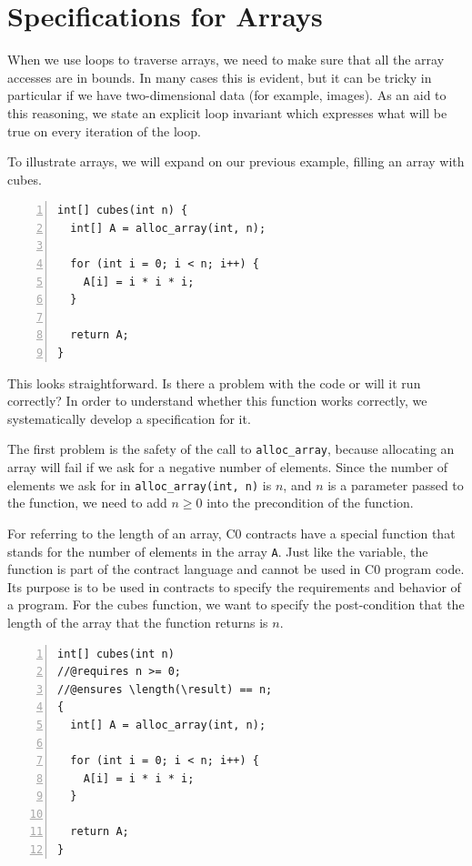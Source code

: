 \section{Specifications for Arrays}
\label{sec:arrays:spec}

When we use loops to traverse arrays, we need to make sure that all
the array accesses are in bounds.  In many cases this is evident, but
it can be tricky in particular if we have two-dimensional data (for
example, images).  As an aid to this reasoning, we state an explicit
loop invariant which expresses what will be true on every iteration of
the loop.

To illustrate arrays, we will expand on our previous example, filling
an array with cubes.
%
\begin{lstlisting}[language={[C0]C}, numbers=left]
int[] cubes(int n) {
  int[] A = alloc_array(int, n);

  for (int i = 0; i < n; i++) {
    A[i] = i * i * i;
  }

  return A;
}
\end{lstlisting}

\noindent
This looks straightforward. Is there a problem with the code or will
it run correctly?  In order to understand whether this function works
correctly, we systematically develop a specification for it.

The first problem is the safety of the call to
\lstinline'alloc_array', because allocating an array will fail if we
ask for a negative number of elements. Since the number of elements we
ask for in \lstinline'alloc_array(int, n)' is $n$, and $n$ is a
parameter passed to the function, we need to add $n \geq 0$ into the
precondition of the function.

For referring to the length of an array, C0 contracts have a special
function  that stands for the number of elements in the
array \lstinline'A'.  Just like the \result{} variable, the function
\length{} is part of the contract language and cannot be used in C0
program code. Its purpose is to be used in contracts to specify the
requirements and behavior of a program.  For the cubes function, we
want to specify the post-condition that the length of the array that
the function returns is $n$.

%
\begin{lstlisting}[language={[C0]C}, numbers=left]
int[] cubes(int n)
//@requires n >= 0;
//@ensures \length(\result) == n;
{
  int[] A = alloc_array(int, n);

  for (int i = 0; i < n; i++) {
    A[i] = i * i * i;
  }

  return A;
}
\end{lstlisting}


